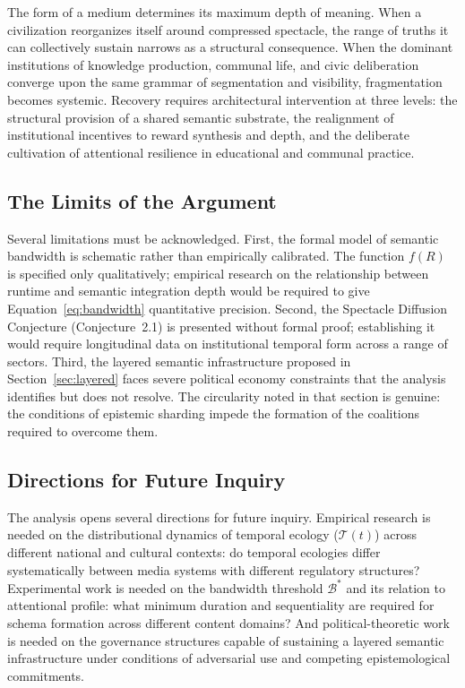 \documentclass[12pt]{article}
\theoremstyle{definition}
\theoremstyle{plain}
\begin{document}
\begin{tcolorbox}[claimbox]
The form of a medium determines its maximum depth of meaning. When a civilization reorganizes itself around compressed spectacle, the range of truths it can collectively sustain narrows as a structural consequence. When the dominant institutions of knowledge production, communal life, and civic deliberation converge upon the same grammar of segmentation and visibility, fragmentation becomes systemic. Recovery requires architectural intervention at three levels: the structural provision of a shared semantic substrate, the realignment of institutional incentives to reward synthesis and depth, and the deliberate cultivation of attentional resilience in educational and communal practice.
\end{tcolorbox}

\subsection{The Limits of the Argument}

Several limitations must be acknowledged. First, the formal model of semantic bandwidth is schematic rather than empirically calibrated. The function $f(R)$ is specified only qualitatively; empirical research on the relationship between runtime and semantic integration depth would be required to give Equation~\eqref{eq:bandwidth} quantitative precision. Second, the Spectacle Diffusion Conjecture (Conjecture~2.1) is presented without formal proof; establishing it would require longitudinal data on institutional temporal form across a range of sectors. Third, the layered semantic infrastructure proposed in Section~\ref{sec:layered} faces severe political economy constraints that the analysis identifies but does not resolve. The circularity noted in that section is genuine: the conditions of epistemic sharding impede the formation of the coalitions required to overcome them.

\subsection{Directions for Future Inquiry}

The analysis opens several directions for future inquiry. Empirical research is needed on the distributional dynamics of temporal ecology ($\mathcal{T}(t)$) across different national and cultural contexts: do temporal ecologies differ systematically between media systems with different regulatory structures? Experimental work is needed on the bandwidth threshold $\mathcal{B}^*$ and its relation to attentional profile: what minimum duration and sequentiality are required for schema formation across different content domains? And political-theoretic work is needed on the governance structures capable of sustaining a layered semantic infrastructure under conditions of adversarial use and competing epistemological commitments.
\end{document}
